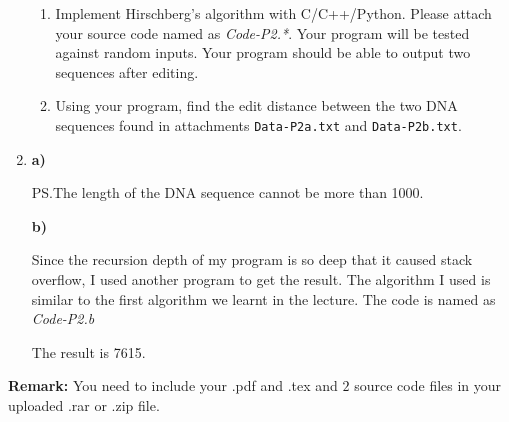 \documentclass[12pt,a4paper]{article}
\makeatletter
\newtheorem*{solution}{Solution}
\theoremstyle{definition}
\renewenvironment{solution}[1][Solution] {\par\pushQED{\qed}\normalfont\topsep6\p@\@plus6\p@\relax\trivlist\item[\hskip\labelsep\bfseries#1\@addpunct{.}]\ignorespaces}{\popQED\endtrivlist\@endpefalse} \makeatother
\makeatother
\begin{document}
\begin{enumerate}
    \begin{enumerate}
        \item
        Implement Hirschberg's algorithm with C/C++/Python. Please attach your source code named as {\color{red}\emph{Code-P2.*}}. Your program will be tested against random inputs. Your program should be able to output two sequences after editing.

        \item
        Using your program, find the edit distance between the two DNA sequences found in attachments \texttt{Data-P2a.txt} and \texttt{Data-P2b.txt}.
    \end{enumerate}
    \begin{solution}
        \textbf{a)}

        PS.The length of the  DNA sequence cannot be more than 1000.

        \textbf{b)} 

        Since the recursion depth of my program is so deep that it caused stack overflow, I used another program to get the result. The algorithm I used is similar to the first algorithm we learnt in the lecture. The code is named as {\color{red}\emph{Code-P2.b}}

        The result is 7615.
    \end{solution}

\end{enumerate}

\vspace{20pt}

\textbf{Remark:} You need to include your .pdf and .tex and {\color{red}\emph{$2$}} source code files in your uploaded .rar or .zip file.

\end{document}
